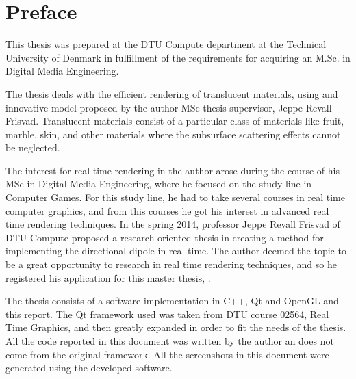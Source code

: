 \chapter{Preface}

\vspace{1cm}
This thesis was prepared at the DTU Compute department at the Technical University of Denmark in fulfillment of the
requirements for acquiring an M.Sc. in Digital Media Engineering.

The thesis deals with the efficient rendering of translucent materials, using and innovative model proposed by the author MSc thesis supervisor, Jeppe Revall Frisvad. Translucent materials consist of a particular class of materials like fruit, marble, skin, and other materials where the subsurface scattering effects cannot be neglected. 

The interest for real time rendering in the author arose during the course of his MSc in Digital Media Engineering, where he focused on the study line in Computer Games. For this study line, he had to take several courses in real time computer graphics, and from this courses he got his interest in advanced real time rendering techniques. In the spring 2014, professor Jeppe Revall Frisvad of DTU Compute proposed a research oriented thesis in creating a method for implementing the directional dipole in real time. The author deemed the topic to be a great opportunity to research in real time rendering techniques, and so he registered his application for this master thesis, \emph{\thesistitle}.

The thesis consists of a software implementation in C++, Qt and OpenGL and this report. The Qt framework used was taken from DTU course 02564, Real Time Graphics, and then greatly expanded in order to fit the needs of the thesis. All the code reported in this document was written by the author an does not come from the original framework. All the screenshots in this document were generated using the developed software. 

